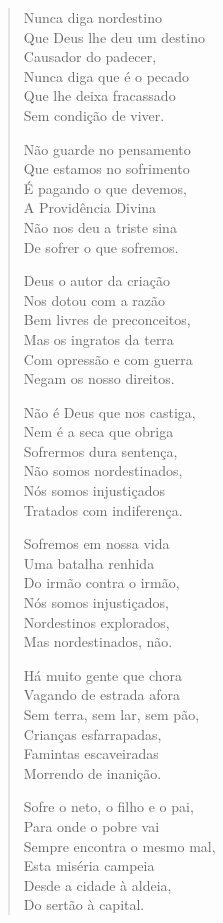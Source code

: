 \begin{verse}
Nunca diga nordestino\\
Que Deus lhe deu um destino\\
Causador do padecer,\\
Nunca diga que é o pecado\\
Que lhe deixa fracassado\\
Sem condição de viver.

Não guarde no pensamento\\
Que estamos no sofrimento\\
É pagando o que devemos,\\
A Providência Divina\\
Não nos deu a triste sina\\
De sofrer o que sofremos.

Deus o autor da criação\\
Nos dotou com a razão\\
Bem livres de preconceitos,\\
Mas os ingratos da terra\\
Com opressão e com guerra\\
Negam os nosso direitos.

Não é Deus que nos castiga,\\
Nem é a seca que obriga\\
Sofrermos dura sentença,\\
Não somos nordestinados,\\
Nós somos injustiçados\\
Tratados com indiferença.

Sofremos em nossa vida\\
Uma batalha renhida\\
Do irmão contra o irmão,\\
Nós somos injustiçados,\\
Nordestinos explorados,\\
Mas nordestinados, não.

Há muito gente que chora\\
Vagando de estrada afora\\
Sem terra, sem lar, sem pão,\\
Crianças esfarrapadas,\\
Famintas escaveiradas\\
Morrendo de inanição.

Sofre o neto, o filho e o pai,\\
Para onde o pobre vai\\
Sempre encontra o mesmo mal,\\
Esta miséria campeia\\
Desde a cidade à aldeia,\\
Do sertão à capital.


\end{verse}
